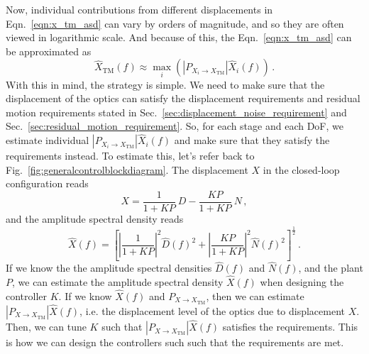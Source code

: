 Now, individual contributions from different displacements in Eqn.~\eqref{eqn:x_tm_asd} can vary by orders of magnitude, and so they are often viewed in logarithmic scale.
And because of this, the Eqn.~\eqref{eqn:x_tm_asd} can be approximated as
\begin{equation}
	\hat{X}_\mathrm{TM}(f) \approx \max_i \left(\left\lvert P_{X_i\to X_\mathrm{TM}} \right\rvert \hat{X}_i(f)\right)\,.
\end{equation}
With this in mind, the strategy is simple.
We need to make sure that the displacement of the optics can satisfy the displacement requirements and residual motion requirements stated in Sec.~\ref{sec:displacement_noise_requirement} and Sec.~\ref{sec:residual_motion_requirement}.
So, for each stage and each DoF, we estimate individual $\left\lvert P_{X_i\to X_\mathrm{TM}}\right\rvert \hat{X}_i(f)$ and make sure that they satisfy the requirements instead.
To estimate this, let's refer back to Fig.~\ref{fig:generalcontrolblockdiagram}.
The displacement $X$ in the closed-loop configuration reads
\begin{equation}
	X = \frac{1}{1+KP}\ D - \frac{KP}{1+KP}\ N\,,
\end{equation}
and the amplitude spectral density reads
\begin{equation}
	\hat{X}(f) = \left[\left\lvert\frac{1}{1+KP}\right\rvert^2\hat{D}(f)^2 + \left\lvert\frac{KP}{1+KP}\right\rvert^2\hat{N}(f)^2\right]^\frac{1}{2}\,.
	\label{eqn:x_asd}
\end{equation}
If we know the the amplitude spectral densities $\hat{D}(f)$ and $\hat{N}(f)$, and the plant $P$, we can estimate the amplitude spectral density $\hat{X}(f)$ when designing the controller $K$.
If we know $\hat{X}(f)$ and $P_{X\to X_\mathrm{TM}}$, then we can estimate $\left\lvert P_{X\to X_\mathrm{TM}}\right\rvert \hat{X}(f)$, i.e. the displacement level of the optics due to displacement $X$.
Then, we can tune $K$ such that $\left\lvert P_{X\to X_\mathrm{TM}}\right\rvert \hat{X}(f)$ satisfies the requirements.
This is how we can design the controllers such such that the requirements are met.


